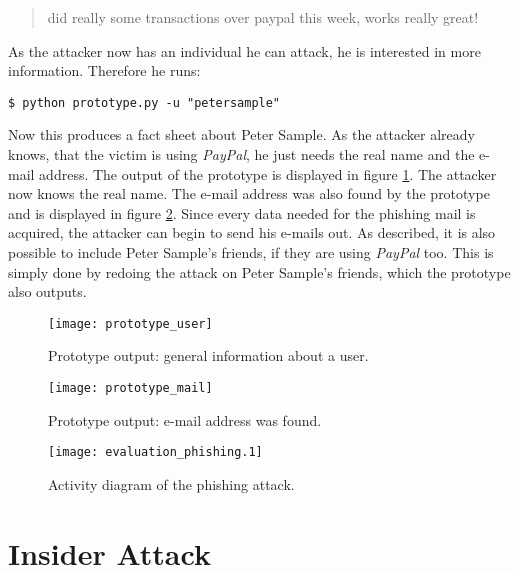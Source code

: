 \begin{quote}
did really some transactions over paypal this week, works really great!
\end{quote}

As the attacker now has an individual he can attack, he is interested in more
information. Therefore he runs:

\lstset{language=bash}
\begin{lstlisting}
$ python prototype.py -u "petersample"
\end{lstlisting}

Now this produces a fact sheet about Peter Sample. As the attacker already
knows, that the victim is using \textit{PayPal}, he just needs the real name
and the e-mail address. The output of the prototype is displayed in figure
\ref{fig:prototype_user}. The attacker now knows the real name. The e-mail
address was also found by the prototype and is displayed in figure
\ref{fig:prototype_mail}. Since every data needed for the phishing mail is
acquired, the attacker can begin to send his e-mails out. As described,
it is also possible to include Peter Sample's friends, if they are using
\textit{PayPal} too. This is simply done by redoing the attack on Peter
Sample's friends, which the prototype also outputs.

\begin{figure}[htb]
  \begin{center}
    \texttt{[image: prototype\_user]}
    \caption{Prototype output: general information about a user.}
    \label{fig:prototype_user}
  \end{center}
\end{figure}

\begin{figure}[htb]
  \begin{center}
    \texttt{[image: prototype\_mail]}
    \caption{Prototype output: e-mail address was found.}
    \label{fig:prototype_mail}
  \end{center}
\end{figure}

\begin{figure}[ht]
  \begin{center}
    \texttt{[image: evaluation\_phishing.1]}
    \caption{Activity diagram of the phishing attack.}
    \label{fig:evaluation_phishing}
  \end{center}
\end{figure}

\section{Insider Attack}

